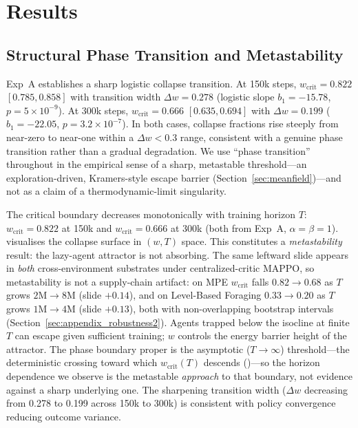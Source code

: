 \documentclass[letterpaper]{article}
\theoremstyle{plain}
\newcommand{\wcrit}{w_{\mathrm{crit}}}
\begin{document}
\section{Results}
\label{sec:results}

\subsection{Structural Phase Transition and Metastability}
\label{sec:results_structural}

Exp~A establishes a sharp logistic collapse transition.
At 150k steps, $\wcrit = 0.822$ $[0.785, 0.858]$ with transition width
$\Delta w = 0.278$ (logistic slope $b_1 = -15.78$, $p = 5 \times 10^{-9}$).
At 300k steps, $\wcrit = 0.666$ $[0.635, 0.694]$ with $\Delta w = 0.199$
($b_1 = -22.05$, $p = 3.2 \times 10^{-7}$).
In both cases, collapse fractions rise steeply from near-zero to near-one
within a $\Delta w < 0.3$ range, consistent with a genuine phase
transition rather than a gradual degradation.
We use ``phase transition'' throughout in the empirical sense of a sharp,
metastable threshold---an exploration-driven, Kramers-style escape barrier
(Section~\ref{sec:meanfield})---and not as a claim of a thermodynamic-limit
singularity.

The critical boundary decreases monotonically with training horizon $T$:
$\wcrit = 0.822$ at 150k and $\wcrit = 0.666$ at 300k (both from Exp~A,
$\alpha{=}\beta{=}1$).
 visualises the collapse surface in $(w, T)$ space.
This constitutes a \emph{metastability} result: the lazy-agent attractor
is not absorbing.
The same leftward slide appears in \emph{both} cross-environment substrates under
centralized-critic MAPPO, so metastability is not a supply-chain artifact: on MPE
$\wcrit$ falls $0.82\!\to\!0.68$ as $T$ grows $2\mathrm{M}\!\to\!8\mathrm{M}$
(slide $+0.14$), and on Level-Based Foraging $0.33\!\to\!0.20$ as
$T$ grows $1\mathrm{M}\!\to\!4\mathrm{M}$ (slide $+0.13$), both with
non-overlapping bootstrap intervals (Section~\ref{sec:appendix_robustness2}).
Agents trapped below the isocline at finite $T$ can escape given
sufficient training; $w$ controls the energy barrier height of the
attractor.
The phase boundary proper is the asymptotic ($T\!\to\!\infty$) threshold---the
deterministic crossing toward which $\wcrit(T)$ descends ()---so
the horizon dependence we observe is the metastable \emph{approach} to that
boundary, not evidence against a sharp underlying one.
The sharpening transition width ($\Delta w$ decreasing from 0.278 to
0.199 across 150k to 300k) is consistent with policy convergence reducing
outcome variance.
\end{document}
